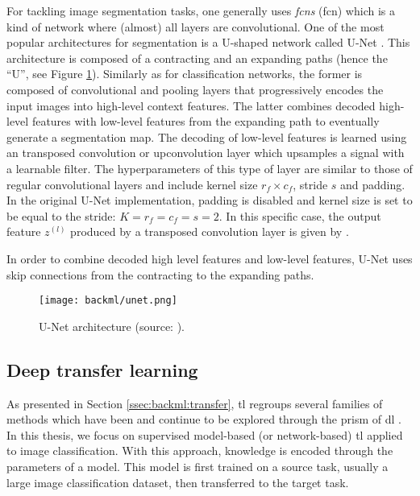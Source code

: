 For tackling image segmentation tasks, one generally uses \textit{\acrlong{fcn}s}
(\acrshort{fcn}) which is a kind of network where (almost) all layers are
convolutional. One of the most popular architectures for segmentation is a U-shaped
network called U-Net \cite{ronneberger2015unet}. This architecture is composed
of a contracting and an expanding paths (hence the ``U'', see Figure
\ref{fig:backml:unet}). Similarly as for classification networks, the former is
composed of convolutional and pooling layers that progressively encodes the input
images into high-level context features. The latter combines decoded high-level
features with low-level features from the expanding path to eventually generate
a segmentation map. The decoding of low-level features is learned using an
transposed convolution or upconvolution layer which upsamples a signal with a
learnable filter. The hyperparameters of this type of layer are similar to those of 
regular convolutional layers and include kernel size $r_f \times c_f$, stride $s$ and padding. 
In the original U-Net implementation, padding is disabled and kernel size is set to be equal 
to the stride: $K = r_f = c_f = s = 2$. In this specific case, the output feature $z^{(l)}_{}$ produced by 
a transposed convolution layer is given by .
 
In order to combine decoded high level features and low-level
features, U-Net uses skip connections from the contracting to the expanding
paths.

\begin{figure}
  \centering
  \texttt{[image: backml/unet.png]}
  \caption{U-Net architecture (source: \cite{ronneberger2015unet}).}
  \label{fig:backml:unet}
\end{figure}

\subsection{Deep transfer learning}
\label{ssec:backml:dl:deeptransfer}

As presented in Section \ref{ssec:backml:transfer}, \acrlong{tl} regroups several
families of methods which have been and continue to be explored through the prism
of \acrlong{dl} \cite{tan2018survey}. In this thesis, we focus on supervised
model-based (or network-based) \acrlong{tl} applied to image classification. With
this approach, knowledge is encoded through the parameters of a model. This model
is first trained on a source task, usually a large image classification dataset,
then transferred to the target task.

